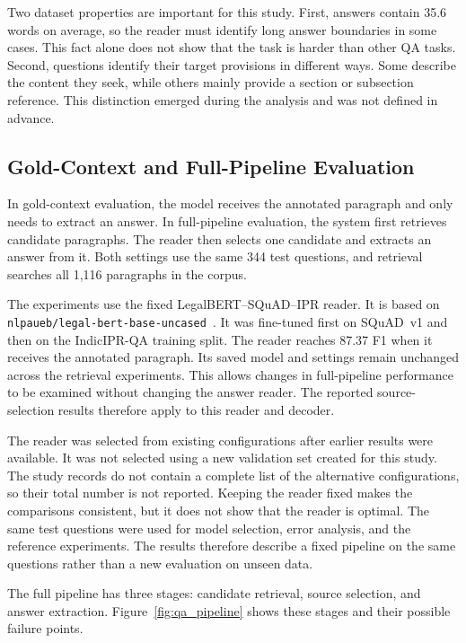 \documentclass[pdflatex,sn-basic]{sn-jnl}%
\theoremstyle{thmstyleone}%
\theoremstyle{thmstyletwo}%
\theoremstyle{thmstylethree}%
\newcommand{\fixedreader}{LegalBERT--SQuAD--IPR}
\begin{document}
\FloatBarrier

Two dataset properties are important for this study. First, answers contain
35.6 words on average, so the reader must identify long answer boundaries in
some cases. This fact alone does not show that the task is harder than other
QA tasks. Second, questions identify their target provisions in different
ways. Some describe the content they seek, while others mainly provide a
section or subsection reference. This distinction emerged during the analysis
and was not defined in advance.

\subsection{Gold-Context and Full-Pipeline Evaluation}

In gold-context evaluation, the model receives the annotated paragraph and
only needs to extract an answer. In full-pipeline evaluation, the system first
retrieves candidate paragraphs. The reader then selects one candidate and
extracts an answer from it. Both settings use the same 344 test questions, and
retrieval searches all 1,116 paragraphs in the corpus.

The experiments use the fixed \fixedreader{} reader. It is based on
\texttt{nlpaueb/legal-bert-base-uncased}~\citep{chalkidis2020legalbert}. It was
fine-tuned first on SQuAD~v1 and then on the IndicIPR-QA training split. The
reader reaches 87.37 F1 when it receives the annotated paragraph. Its saved
model and settings remain unchanged across the retrieval experiments. This
allows changes in full-pipeline performance to be examined without changing
the answer reader. The reported source-selection results therefore apply to
this reader and decoder.

The reader was selected from existing configurations after earlier results
were available. It was not selected using a new validation set created for
this study. The study records do not contain a complete list of the alternative
configurations, so their total number is not reported. Keeping the reader fixed
makes the comparisons consistent, but it does not show that the reader is
optimal. The same test questions were used for model selection, error analysis,
and the reference experiments. The results therefore describe a fixed pipeline
on the same questions rather than a new evaluation on unseen data.

The full pipeline has three stages: candidate retrieval, source selection, and
answer extraction. Figure~\ref{fig:qa_pipeline} shows these stages and their
possible failure points.
\end{document}
